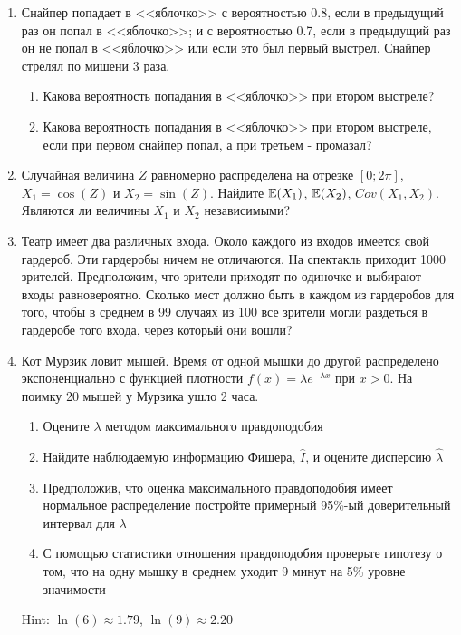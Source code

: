 \documentclass[pdftex,12pt,a4paper]{article}
\begin{document}
\begin{enumerate}

\item Снайпер попадает в <<яблочко>> с вероятностью 0.8, если в предыдущий раз он попал в <<яблочко>>; и с вероятностью 0.7, если в предыдущий раз он не попал в <<яблочко>> или если это был первый выстрел. Снайпер стрелял по мишени 3 раза. 
\begin{enumerate}
\item Какова вероятность попадания в <<яблочко>> при втором выстреле?
\item Какова вероятность попадания в <<яблочко>> при втором выстреле, если при первом снайпер попал, а при третьем - промазал?
\end{enumerate}

\item Случайная величина $Z$ равномерно распределена на отрезке  $[0;2\pi]$, $X_1=\cos(Z)$ и $X_2=\sin(Z)$. Найдите $\mathbb{E}(X_1)$, $\mathbb{E}(X_2)$, $Cov(X_1,X_2)$. Являются ли величины $X_1$ и $X_2$ независимыми?

\item Театр имеет два различных входа. Около каждого из входов имеется свой гардероб. Эти гардеробы ничем не отличаются.  На спектакль приходит 1000 зрителей. Предположим, что зрители приходят по одиночке и выбирают входы равновероятно. Сколько мест должно быть в каждом из гардеробов для того, чтобы в среднем в 99 случаях из 100 все зрители могли раздеться в гардеробе того входа, через который они вошли? 

\item Кот Мурзик ловит мышей. Время от одной мышки до другой распределено экспоненциально с функцией плотности $f(x)=\lambda e^{-\lambda x}$ при $x>0$. На поимку 20 мышей у Мурзика ушло 2 часа. 
\begin{enumerate}
\item Оцените $\lambda$ методом максимального правдоподобия
\item Найдите наблюдаемую информацию Фишера, $\hat{I}$, и оцените дисперсию $\hat{\lambda}$
\item Предположив, что оценка максимального правдоподобия имеет нормальное распределение постройте примерный 95\%-ый доверительный интервал для $\lambda$
\item С помощью статистики отношения правдоподобия проверьте гипотезу о том, что на одну мышку в среднем уходит 9 минут на 5\% уровне значимости
\end{enumerate}

Hint: $\ln(6)\approx 1.79$, $\ln(9)\approx 2.20$



\end{enumerate}
\end{document}
